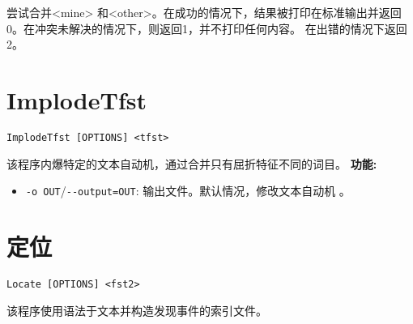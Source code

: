 尝试合并<mine> 和<other>。在成功的情况下，结果被打印在标准输出并返回0。在冲突未解决的情况下，则返回1，并不打印任何内容。 在出错的情况下返回2。 



\section{ImplodeTfst}
 \verb+ImplodeTfst [OPTIONS] <tfst>+

\bigskip
\noindent 该程序内爆特定的文本自动机，通过合并只有屈折特征不同的词目。
\bigskip
\noindent \textbf{功能:}
\begin{itemize}
\item \verb+-o OUT+/\verb+--output=OUT+: 输出文件。默认情况，修改文本自动机 。
\end{itemize}






\section{定位}
\label{section-Locate}
\verb+Locate [OPTIONS] <fst2>+

\bigskip
\noindent {}
该程序使用语法于文本并构造发现事件的索引文件。


